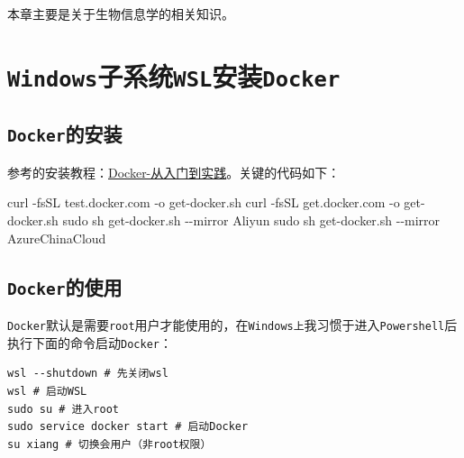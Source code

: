 \documentclass[
]{book}
\newenvironment{Shaded}{\begin{snugshade}}{\end{snugshade}}
\newcommand{\NormalTok}[1]{#1}
\newcommand{\SpecialCharTok}[1]{\textcolor[rgb]{0.00,0.00,0.00}{#1}}
\begin{document}
本章主要是关于生物信息学的相关知识。

\hypertarget{windowsux5b50ux7cfbux7edfwslux5b89ux88c5docker}{%
\section{\texorpdfstring{\texttt{Windows}子系统\texttt{WSL}安装\texttt{Docker}}{Windows子系统WSL安装Docker}}\label{windowsux5b50ux7cfbux7edfwslux5b89ux88c5docker}}

\hypertarget{dockerux7684ux5b89ux88c5}{%
\subsection{\texorpdfstring{\texttt{Docker}的安装}{Docker的安装}}\label{dockerux7684ux5b89ux88c5}}

参考的安装教程：\href{https://yeasy.gitbook.io/docker_practice/install/ubuntu}{Docker-从入门到实践}。关键的代码如下：

\begin{Shaded}
\begin{Highlighting}[]
\NormalTok{curl }\SpecialCharTok{{-}}\NormalTok{fsSL test.docker.com }\SpecialCharTok{{-}}\NormalTok{o get}\SpecialCharTok{{-}}\NormalTok{docker.sh}
\NormalTok{curl }\SpecialCharTok{{-}}\NormalTok{fsSL get.docker.com }\SpecialCharTok{{-}}\NormalTok{o get}\SpecialCharTok{{-}}\NormalTok{docker.sh}
\NormalTok{sudo sh get}\SpecialCharTok{{-}}\NormalTok{docker.sh }\SpecialCharTok{{-}{-}}\NormalTok{mirror Aliyun}
\NormalTok{sudo sh get}\SpecialCharTok{{-}}\NormalTok{docker.sh }\SpecialCharTok{{-}{-}}\NormalTok{mirror AzureChinaCloud}
\end{Highlighting}
\end{Shaded}

\hypertarget{dockerux7684ux4f7fux7528}{%
\subsection{\texorpdfstring{\texttt{Docker}的使用}{Docker的使用}}\label{dockerux7684ux4f7fux7528}}

\texttt{Docker}默认是需要\texttt{root}用户才能使用的，在\texttt{Windows上}我习惯于进入\texttt{Powershell}后执行下面的命令启动\texttt{Docker}：

\begin{verbatim}
wsl --shutdown # 先关闭wsl
wsl # 启动WSL
sudo su # 进入root
sudo service docker start # 启动Docker
su xiang # 切换会用户（非root权限）
\end{verbatim}
\end{document}

